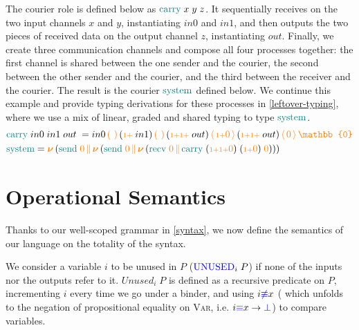 \documentclass[runningheads]{llncs}
\newcommand{\type}[1]{\textcolor{blue}{\operatorname{#1}}}
\newcommand{\constr}[1]{\textcolor{orange}{\operatorname{#1}}}
\newcommand{\func}[1]{\textcolor{teal}{\operatorname{#1}}}
\newcommand{\PO}{\constr{\mathbb{0}}}
\newcommand{\comp}[2]{#1 \, \constr{\parallel} \, #2}
\newcommand{\new}{\constr{\boldsymbol{\nu}} \,}
\newcommand{\send}[2]{#1 \, \constr{\langle} \, #2 \,\constr{\rangle} \,}
\newcommand{\recv}[2]{#1 \, \constr{\mathbb{(}} \, #2 \, \constr{\mathbb{)}} \,}
\newcommand{\suc}{\constr{\scriptstyle 1+}}
\newcommand{\Unused}{\type{UNUSED}}
\begin{document}
\begin{example}
The courier role is defined below as $\func{carry} \; x \; y \; z$.
It sequentially receives on the two input channels $x$ and $y$, instantiating $in0$ and $in1$, and then outputs the two pieces of received data on the output channel $z$, instantiating $out$.
Finally, we create three communication channels and compose all four processes together: the first channel is shared between the one sender and the courier, the second between the other sender and the courier, and the third between the receiver  and the courier.
The result is the courier $\func{system}$ defined below.
We continue this example and provide typing derivations for these processes in \autoref{leftover-typing}, where we use a mix of linear, graded and shared typing to type $\func{system}$.
\begin{align*}
  & \func{carry} \; in0 \; in1 \; out \; =  \recv{in0 }{} 
  \recv{(\suc \; in1) }{} 
  \send{(\suc \suc \; out) }{\suc \constr{0}} 
  \send{(\suc \suc \; out) }{\constr{0}} \PO \\
  & \func{system} =  \new{} ( \func{send} \; \constr{0} 
  \comp{}{\new{} ( \func{send} \; \constr{0} } 
  \comp{}{\new{} ( \func{recv} \; \constr{0} } 
  \comp{}{\func{carry} \; (\suc \suc \constr{0}) \; (\suc \constr{0}) \; \constr{0}))) } 
\end{align*}
\end{example}

\section{Operational Semantics}
\label{semantics}
Thanks to our well-scoped grammar in \autoref{syntax}, we now define the semantics of our language on the totality of the syntax.

\begin{nidefinition} \label{def:unused}
  We consider a variable $i$ to be unused in $P$ ($\Unused_i \; P$) if none of the inputs nor the outputs refer to it.
  $Unused_i \; P$ is defined as a recursive predicate on $P$, incrementing $i$ every time we go under a binder, and using $i \type{\not\equiv} x$ ( which unfolds to the negation of propositional equality on \textsc{Var}, i.e. $i \type{\equiv} x \to \type{\bot}$) to compare variables.
\end{nidefinition}
\end{document}
